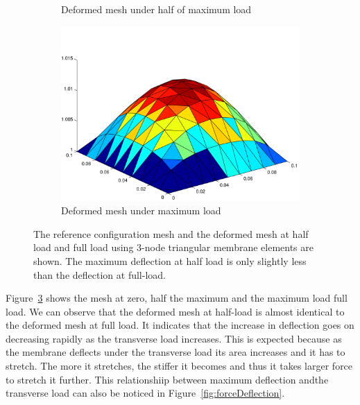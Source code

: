 \documentclass[../main.tex]{subfiles}
\begin{document}
\begin{figure}[ht]
\begin{subfigure}[b]{0.3\textwidth}
    \caption{Deformed mesh under half of maximum load}
    \label{fig:prob3HalfDeformedMesh}
  \end{subfigure}
  \begin{subfigure}[b]{0.3\textwidth}
    \includegraphics[scale=0.3]{./img/deformedMesh.pdf}
    \caption{Deformed mesh under maximum load}
    \label{fig:prob3FullDeformedMesh}
  \end{subfigure}
  \caption{The reference configuration mesh and the deformed mesh at
    half load and full load using 3-node triangular membrane elements
    are shown. The maximum deflection at half load is only slightly
    less than the deflection at full-load.}
  \label{fig:prob3Mesh}
\end{figure}
Figure~\ref{fig:prob3Mesh} shows the mesh at zero, half the maximum
and the maximum load full load. We can observe that the deformed mesh
at half-load is almost identical to the deformed mesh at full load. It
indicates that the increase in deflection goes on decreasing rapidly
as the transverse load increases. This is expected because as the
membrane deflects under the transverse load its area increases and it
has to stretch. The more it stretches, the stiffer it becomes and thus
it takes larger force to stretch it further. This relationshiip
between maximum deflection andthe transverse load can also be noticed
in Figure~\ref{fig:forceDeflection}.
\end{document}
